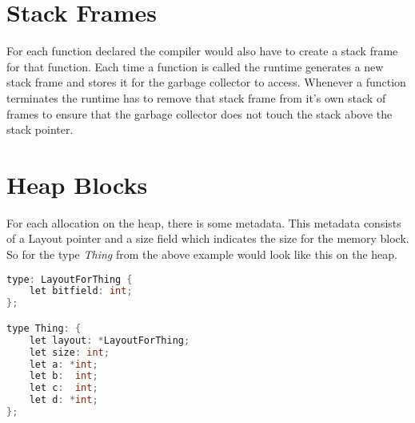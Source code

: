 \section*{Stack Frames}

For each function declared the compiler would also have to create a stack frame for that function. Each time a function is called the runtime generates a new stack frame and stores it for the garbage collector to access. Whenever a function terminates the runtime has to remove that stack frame from it's own stack of frames to ensure that the garbage collector does not touch the stack above the stack pointer.

\section*{Heap Blocks}
For each allocation on the heap, there is some metadata. This metadata consists of a Layout pointer and a size field which indicates the size for the memory block. So for the type \textit{Thing} from the above example would look like this on the heap.

\begin{lstlisting}[language=C,morekeywords={Thing, LayoutForThing}]
type: LayoutForThing {
    let bitfield: int;
};

type Thing: {
    let layout: *LayoutForThing;
    let size: int;
    let a: *int;
    let b:  int;
    let c:  int;
    let d: *int;
};
\end{lstlisting}
